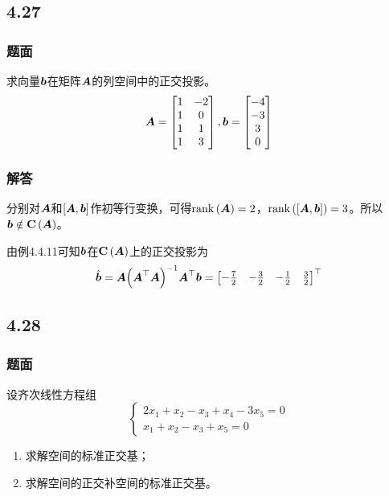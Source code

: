 \documentclass{beamer}
\begin{document}
\subsection*{4.27}
\begin{frame}
    \frametitle{题面}
    求向量\(\boldsymbol{b}\)在矩阵\(\boldsymbol{A}\)的列空间中的正交投影。
    \begin{equation*}
        \boldsymbol{A}=
        \begin{bmatrix}
            1 & -2 \\
            1 & 0  \\
            1 & 1  \\
            1 & 3
        \end{bmatrix},
        \boldsymbol{b}=\begin{bmatrix}-4\\-3\\3\\0\end{bmatrix}
    \end{equation*}
\end{frame}

\begin{frame}
    \frametitle{解答}
    分别对\(\boldsymbol{A}\)和\(\left[ \boldsymbol{A},\boldsymbol{b} \right]\)作初等行变换，可得\(\mathrm{rank}\left( \boldsymbol{A} \right)=2\)，\(\mathrm{rank}\left( \left[ \boldsymbol{A},\boldsymbol{b} \right] \right)=3\)。所以\(\boldsymbol{b}\notin\boldsymbol{\mathrm{C}}\left( \boldsymbol{A} \right)\)。

    由例4.4.11可知\(\boldsymbol{b}\)在\(\boldsymbol{\mathrm{C}}\left( \boldsymbol{A} \right)\)上的正交投影为
    \begin{equation*}
        \hat{\boldsymbol{b}}=\boldsymbol{A}{\left( \boldsymbol{A}^\top\boldsymbol{A} \right)}^{-1}\boldsymbol{A}^\top\boldsymbol{b}=
        \begin{bmatrix}
            -\frac{7}{2} & -\frac{3}{2} & -\frac{1}{2} & \frac{3}{2}
        \end{bmatrix}^\top
    \end{equation*}
\end{frame}

\subsection*{4.28}
\begin{frame}
    \frametitle{题面}
    设齐次线性方程组
    \begin{equation*}
        \begin{cases}
            2x_1+x_2-x_3+x_4-3x_5=0 \\
            x_1+x_2-x_3+x_5=0
        \end{cases}
    \end{equation*}
    \begin{enumerate}
        \item 求解空间的标准正交基；
        \item 求解空间的正交补空间的标准正交基。
    \end{enumerate}
\end{frame}
\end{document}
